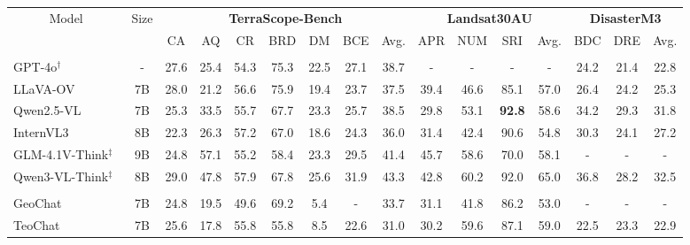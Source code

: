 
\begin{table}[!t]
    \scriptsize
    \centering
    \vspace{-4mm}
    \setlength\tabcolsep{7.2pt}
    \setlength{\extrarowheight}{0.1pt}
    \begin{tabular}{lc|ccccccc|cccc|ccc}
    \toprule
    \multicolumn{1}{c}{Model} & \multicolumn{1}{c|}{Size}
    & \multicolumn{7}{c|}{\textbf{TerraScope-Bench}}
    & \multicolumn{4}{c|}{\textbf{Landsat30AU}}
    & \multicolumn{3}{c}{\textbf{DisasterM3}} \\
    \cmidrule(lr){3-9}\cmidrule(lr){10-13}\cmidrule(lr){14-16}
     & & CA & AQ & CR & BRD & DM & BCE & Avg.
     & APR & NUM & SRI & Avg.
     & BDC & DRE & Avg. \\
    \midrule
    \rowcolor{gray!15}\multicolumn{16}{c}{\textbf{General VLMs}} \\
    GPT-4o$^{\dagger}$~\cite{gpt4o}            & - & 27.6 & 25.4 & 54.3 & 75.3 & 22.5 & 27.1 & 38.7 & - & - & - & - & 24.2 & 21.4 & 22.8 \\
    LLaVA-OV~\cite{li2024llava} & 7B & 28.0 & 21.2 & 56.6 & 75.9 & 19.4 & 23.7  & 37.5 & 39.4 & 46.6 & 85.1 & 57.0 & 26.4 & 24.2 & 25.3 \\
    Qwen2.5-VL~\cite{bai2025qwen2} & 7B &25.3 & 33.5 & 55.7 & 67.7 & 23.3 & 25.7 & 38.5 & 29.8 & 53.1 & \textbf{92.8} & 58.6 & 34.2 & 29.3 & 31.8 \\
    InternVL3~\cite{zhu2025internvl3} &8B & 22.3 & 26.3 & 57.2 & 67.0 & 18.6 & 24.3 & 36.0 & 31.4 & 42.4 & 90.6 & 54.8 & 30.3 & 24.1 & 27.2 \\
    GLM-4.1V-Think$^{\ddagger}$~\cite{hong2025glm} &9B & 24.8 & 57.1 & 55.2 & 58.4 & 23.3 & 29.5 & 41.4 & 45.7 & 58.6 & 70.0 & 58.1 & - & - & - \\
    Qwen3-VL-Think$^{\ddagger}$~\cite{bai2025qwen2} &8B & 29.0 & 47.8 & 57.9 & 67.8 & 25.6 & 31.9 & 43.3 &42.8 & 60.2 & 92.0 & 65.0 & 36.8 & 28.2 & 32.5 \\
    \midrule
    \rowcolor{gray!15}\multicolumn{16}{c}{\textbf{EO-Specific VLMs}} \\
    GeoChat~\cite{kuckreja2024geochat}    & 7B & 24.8 & 19.5 & 49.6 & 69.2 & 5.4 & - & 33.7 & 31.1 & 41.8 & 86.2 & 53.0 & - & - & - \\
    TeoChat~\cite{irvin2024teochat}          & 7B &25.6 & 17.8 & 55.8 & 55.8 & 8.5 & 22.6 & 31.0 & 30.2 & 59.6 & 87.1 & 59.0 & 22.5 & 23.3 & 22.9 \\

\end{tabular}
\end{table}
